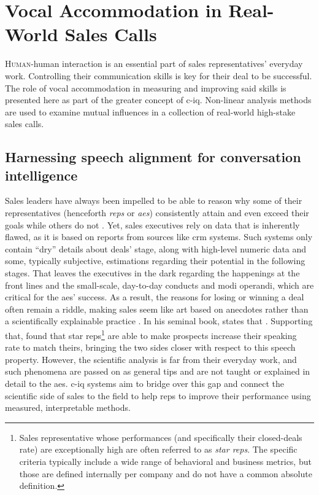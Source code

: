 \chapter{Vocal Accommodation in Real-World Sales Calls}
\label{chap:conv_analysis}

\lettrine{H}{uman}-human interaction is an essential part of sales representatives' everyday work.
Controlling their communication skills is key for their deal to be successful.
The role of vocal accommodation in measuring and improving said skills is presented here as part of the greater concept of \acl{c-iq}.
Non-linear analysis methods are used to examine mutual influences in a collection of real-world high-stake sales calls.

\pagebreak

\section{Harnessing speech alignment for conversation intelligence}
\label{sec:conversation_intelligence}

Sales leaders have always been impelled to be able to reason why some of their representatives (henceforth \emph{reps} or \emph{\acp{ae}}) consistently attain and even exceed their goals while others do not \citep{Kovac2017its}.
Yet, sales executives rely on data that is inherently flawed, as it is based on reports from sources like \ac{crm} systems.
Such systems only contain \enquote{dry} details about deals' stage, along with high-level numeric data and some, typically subjective, estimations regarding their potential in the following stages.
That leaves the executives in the dark regarding the happenings at the front lines and the small-scale, day-to-day conducts and modi operandi, which are critical for the \acp{ae}' success.
As a result, the reasons for losing or winning a deal often remain a riddle, making sales seem like art based on anecdotes rather than a scientifically explainable practice \citep{Yohn2016best, Martin2017six}.
In his seminal book, \citet{Gladwell2006tipping} states that .
Supporting that, \citet{Orlob2018nine} found that star reps\footnote{Sales representative whose performances (and specifically their closed-deals rate) are exceptionally high are often referred to as \emph{star reps}.
The specific criteria typically include a wide range of behavioral and business metrics, but those are defined internally per company and do not have a common absolute definition.} are able to make prospects increase their speaking rate to match theirs, bringing the two sides closer with respect to this speech property.
However, the scientific analysis is far from their everyday work, and such phenomena are passed on as general tips and are not taught or explained in detail to the \acp{ae}.
\Ac{c-iq} systems aim to bridge over this gap and connect the scientific side of sales to the field to help reps to improve their performance using measured, interpretable methods.


